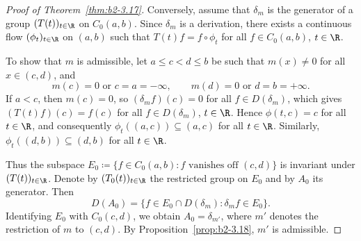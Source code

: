 \begin{proof}[Proof of Theorem~\ref{thm:b2-3.17}]
Conversely, assume that $\delta_{m}$ is the generator of a group $(T(t))_{t \in \R}$
on $C_{0}(a,b)$.
Since $\delta_{m}$ is a derivation, there exists a continuous flow $(\phi_{t})_{t \in \R}$
on $(a,b)$ such that $T(t)f = f \circ \phi_{t}$ for all $f \in C_{0}(a,b)$, $t \in \R$.

To show that $m$ is admissible, let $a \leq c < d \leq b$ be such that $m(x) \neq 0$
for all $x \in (c,d)$, and
\[
    m(c) = 0 \text{ or } c = a = -\infty,
    \qquad
    m(d) = 0 \text{ or } d = b = +\infty.
\]
If\/ $a < c$, then $m(c) = 0$, so $(\delta_{m}f)(c) = 0$ for all $f \in D(\delta_{m})$,
which gives $(T(t)f)(c) = f(c)$ for all $f \in D(\delta_{m})$, $t \in \R$.
Hence $\phi(t,c) = c$ for all $t \in \R$, and consequently
$\phi_{t}((a,c)) \subseteq (a,c)$ for all $t \in \R$.
Similarly, $\phi_{t}((d,b)) \subseteq (d,b)$ for all $t \in \R$.

Thus the subspace $E_{0} \coloneq \{f \in C_{0}(a,b) : f \text{ vanishes off } (c,d)\}$
is invariant under $(T(t))_{t \in \R}$.
Denote by $(T_{0}(t))_{t \in \R}$ the restricted group on $E_{0}$ and by $A_{0}$ its generator.
Then
\[
    D(A_{0}) = \{f \in E_{0} \cap D(\delta_{m}) : \delta_{m}f \in E_{0}\}.
\]
Identifying $E_{0}$ with $C_{0}(c,d)$, we obtain $A_{0} = \delta_{m'}$, where $m'$
denotes the restriction of\/ $m$ to $(c,d)$.
By Proposition~\ref{prop:b2-3.18}, $m'$ is admissible.
\end{proof}
